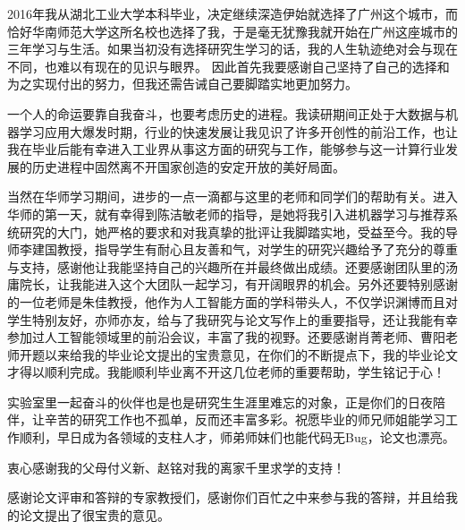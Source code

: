 ﻿%
\begin{ack}
2016年我从湖北工业大学本科毕业，决定继续深造伊始就选择了广州这个城市，而恰好华南师范大学这所名校也选择了我，于是毫无犹豫我就开始在广州这座城市的三年学习与生活。如果当初没有选择研究生学习的话，我的人生轨迹绝对会与现在不同，也难以有现在的见识与眼界。
因此首先我要感谢自己坚持了自己的选择和为之实现付出的努力，但我还需告诫自己要脚踏实地更加努力。

一个人的命运要靠自我奋斗，也要考虑历史的进程。我读研期间正处于大数据与机器学习应用大爆发时期，行业的快速发展让我见识了许多开创性的前沿工作，也让我在毕业后能有幸进入工业界从事这方面的研究与工作，能够参与这一计算行业发展的历史进程中固然离不开国家创造的安定开放的美好局面。

当然在华师学习期间，进步的一点一滴都与这里的老师和同学们的帮助有关。进入华师的第一天，就有幸得到陈洁敏老师的指导，是她将我引入进机器学习与推荐系统研究的大门，她严格的要求和对我真挚的批评让我脚踏实地，受益至今。我的导师李建国教授，指导学生有耐心且友善和气，对学生的研究兴趣给予了充分的尊重与支持，感谢他让我能坚持自己的兴趣所在并最终做出成绩。还要感谢团队里的汤庸院长，让我能进入这个大团队一起学习，有开阔眼界的机会。另外还要特别感谢的一位老师是朱佳教授，他作为人工智能方面的学科带头人，不仅学识渊博而且对学生特别友好，亦师亦友，给与了我研究与论文写作上的重要指导，还让我能有幸参加过人工智能领域里的前沿会议，丰富了我的视野。还要感谢肖菁老师、曹阳老师开题以来给我的毕业论文提出的宝贵意见，在你们的不断提点下，我的毕业论文才得以顺利完成。我能顺利毕业离不开这几位老师的重要帮助，学生铭记于心！

实验室里一起奋斗的伙伴也是也是研究生生涯里难忘的对象，正是你们的日夜陪伴，让辛苦的研究工作也不孤单，反而还丰富多彩。祝愿毕业的师兄师姐能学习工作顺利，早日成为各领域的支柱人才，师弟师妹们也能代码无Bug，论文也漂亮。

衷心感谢我的父母付义新、赵铭对我的离家千里求学的支持！

感谢论文评审和答辩的专家教授们，感谢你们百忙之中来参与我的答辩，并且给我的论文提出了很宝贵的意见。

\end{ack}
